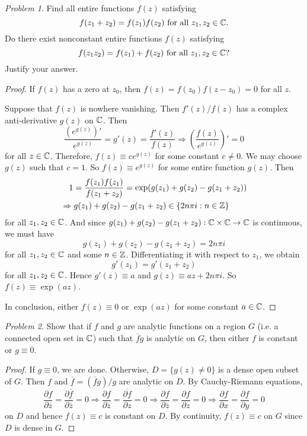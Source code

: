 \documentclass[11pt]{amsart}
\theoremstyle{remark}
\newtheorem{prob}{Problem}[section]
\theoremstyle{definition}
\numberwithin{equation}{section}
\begin{document}
\begin{prob}
    Find all entire functions $f(z)$ satisfying
    \[
        f(z_1 + z_2) = f(z_1) f(z_2) \text{ for all } z_1, z_2\in {\mathbb C}.
    \]
    Do there exist nonconstant entire functions $f(z)$ satisfying
    \[
        f(z_1 z_2) = f(z_1) + f(z_2) \text{ for all } z_1, z_2\in {\mathbb C}?
    \]
    Justify your answer.
\end{prob}

\begin{proof}
    If $f(z)$ has a zero at $z_0$, then $f(z) = f(z_0) f(z-z_0) = 0$ for all $z$.

    Suppose that $f(z)$ is nowhere vanishing. Then $f'(z) /f(z)$ has a complex anti-derivative $g(z)$ on ${\mathbb C}$. Then
    \[
        \frac{(e^{g(z)})'}{e^{g(z)}} = g'(z) = \frac{f'(z)}{f(z)}
        \Rightarrow \left(
        \frac{f(z)}{e^{g(z)}}
        \right)' = 0
    \]
    for all $z\in {\mathbb C}$. Therefore, $f(z) \equiv c e^{g(z)}$ for some constant $c\ne 0$. We may choose $g(z)$ such that $c = 1$. So $f(z) \equiv e^{g(z)}$ for some entire function $g(z)$. Then
    \[
        \begin{aligned}
             & \quad 1 = \frac{f(z_1) f(z_1)}{f(z_1 + z_2)} = \exp (g(z_1) + g(z_2) - g(z_1 + z_2)) \\
             & \Rightarrow g(z_1) + g(z_2) - g(z_1 + z_2) \in \{2n\pi i: n\in {\mathbb Z}\}
        \end{aligned}
    \]
    for all $z_1,z_2\in {\mathbb C}$.
    And since $g(z_1) + g(z_2) - g(z_1+z_2): {\mathbb C}\times {\mathbb C}\to {\mathbb C}$ is continuous, we must have
    \[
        g(z_1) + g(z_2) - g(z_1 + z_2) = 2n\pi i
    \]
    for all $z_1, z_2\in {\mathbb C}$ and some $n\in {\mathbb Z}$. Differentiating it with respect to $z_1$, we obtain
    \[
        g'(z_1) = g'(z_1 + z_2)
    \]
    for all $z_1, z_2\in {\mathbb C}$. Hence $g'(z) \equiv a$ and $g(z) \equiv az + 2n\pi i$. So $f(z) \equiv \exp(az)$.

    In conclusion, either $f(z)\equiv 0$ or $\exp(az)$ for some constant $a\in {\mathbb C}$.
\end{proof}

\begin{prob}
    Show that if $f$ and $g$ are analytic functions on a region $G$ (i.e. a connected open set in ${\mathbb C}$) such that $\overline{f} g$ is analytic on $G$, then either $f$ is constant or $g\equiv 0$.
\end{prob}

\begin{proof}
    If $g\equiv 0$, we are done. Otherwise, $D = \{g(z)\ne 0\}$ is a dense open subset of $G$. Then $f$ and $\overline{f} = (\overline{f} g)/g$ are analytic on $D$. By Cauchy-Riemann equations,
    \[
        \frac{\partial f}{\partial \overline{z}}
        = \frac{\partial \overline{f}}{\partial \overline{z}} = 0
        \Rightarrow \frac{\partial f}{\partial \overline{z}}
        = \overline{\frac{\partial f}{\partial z}} = 0
        \Rightarrow \frac{\partial f}{\partial \overline{z}}
        = \frac{\partial f}{\partial z} = 0
        \Rightarrow \frac{\partial f}{\partial x}
        = \frac{\partial f}{\partial y} = 0
    \]
    on $D$ and hence $f(z)\equiv c$ is constant on $D$. By continuity, $f(z)\equiv c$ on $G$ since $D$ is dense in $G$.
\end{proof}
\end{document}
